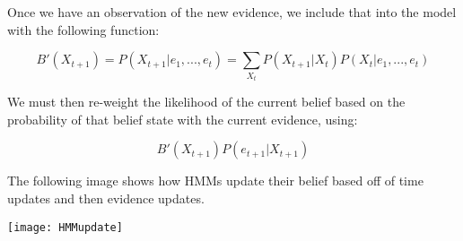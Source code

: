 Once we have an observation of the new evidence, we include that into the model with the following function:\par

\vspace{-32px}
\begin{center}
  \begin{equation}
    B'(X_{t+1})
    = P(X_{t+1} | e_{1}, ..., e_{t})
    = \sum_{X_{t}} P(X_{t+1} | X_{t}) P(X_{t} | e_{1}, ..., e_{t})
  \end{equation}
\end{center}

We must then re-weight the likelihood of the current belief based on the probability of that belief state with the current evidence, using:

\vspace{-32px}
\begin{center}
  \begin{equation}
    B'(X_{t+1}) P(e_{t+1} | X_{t+1})
  \end{equation}
\end{center}

The following image shows how HMM\textquotesingle s update their belief based off of time updates and then evidence updates.

\begin{center}
  \texttt{[image: HMMupdate]}
\end{center}
